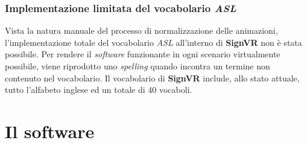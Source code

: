 \documentclass[12pt, a4paper]{article}
\begin{document}
        \subsubsection{Implementazione limitata del vocabolario \textit{ASL}}
        Vista la natura manuale del processo di normalizzazione delle animazioni, 
        l'implementazione totale del vocabolario \textit{ASL} all'interno di 
        \textbf{SignVR} non è stata possibile.
        Per rendere il \textit{software} funzionante in ogni scenario virtualmente 
        possibile, viene riprodotto uno \textit{spelling} quando 
        incontra un termine non contenuto nel vocabolario.
        Il vocabolario di \textbf{SignVR} include, allo stato attuale, tutto l'alfabeto inglese ed un 
        totale di 40 vocaboli.
\section{Il software}
\end{document}
